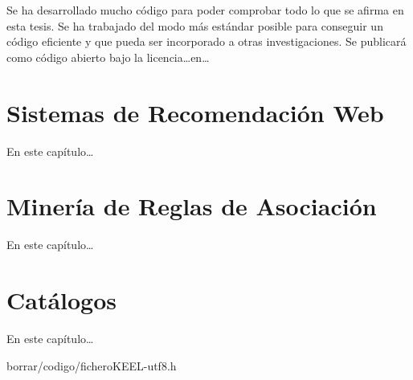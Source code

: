 Se ha desarrollado mucho código para poder comprobar todo lo que se afirma en esta tesis. Se ha trabajado del modo más estándar posible para conseguir un código eficiente y que pueda ser incorporado a otras investigaciones. Se publicará como código abierto bajo la licencia\ldots en\ldots




\section{Sistemas de Recomendación Web}
En este capítulo\ldots

%
%
%   


%
%
%   



\section{Minería de Reglas de Asociación}
En este capítulo\ldots




\section{Catálogos}
En este capítulo\ldots



                       {borrar/codigo/ficheroKEEL-utf8.h}



